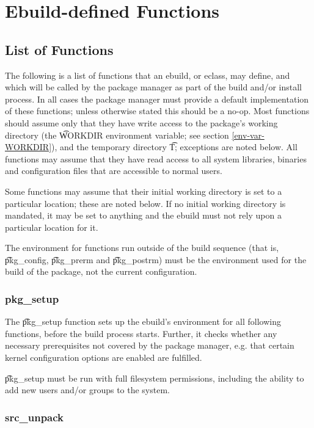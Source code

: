 \chapter{Ebuild-defined Functions}
\label{ebuild-functions}


\section{List of Functions}
\label{functions}

The following is a list of functions that an ebuild, or eclass, may define, and which will be called
by the package manager as part of the build and/or install process. In all cases the package manager
must provide a default implementation of these functions; unless otherwise stated this should be a
no-op. Most functions should assume only that they have write access to the package's working
directory (the \t{WORKDIR} environment variable; see section \ref{env-var-WORKDIR}), and the
temporary directory \t{T}; exceptions are noted below. All functions may assume that they have read
access to all system libraries, binaries and configuration files that are accessible to normal
users.

Some functions may assume that their initial working directory is set to a particular location;
these are noted below. If no initial working directory is mandated, it may be set to anything and
the ebuild must not rely upon a particular location for it.

The environment for functions run outside of the build sequence (that is, \t{pkg\_config},
\t{pkg\_prerm} and \t{pkg\_postrm}) must be the environment used for the build of the package,
not the current configuration.

\subsection{pkg\_setup}
\label{pkg-setup-function}
The \t{pkg\_setup} function sets up the ebuild's environment for all following functions, before
the build process starts. Further, it checks whether any necessary prerequisites not covered
by the package manager, e.g. that certain kernel configuration options are enabled are fulfilled.

\t{pkg\_setup} must be run with full filesystem permissions, including the ability to add new users
and/or groups to the system.

\subsection{src\_unpack}
\label{src-unpack-function}

